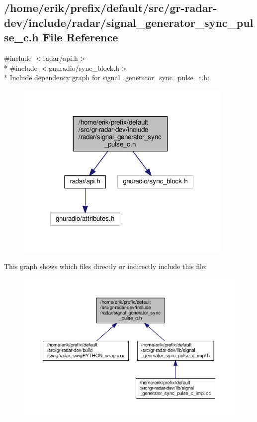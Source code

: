\subsection{/home/erik/prefix/default/src/gr-\/radar-\/dev/include/radar/signal\+\_\+generator\+\_\+sync\+\_\+pulse\+\_\+c.h File Reference}
\label{signal__generator__sync__pulse__c_8h}
{\ttfamily \#include $<$radar/api.\+h$>$}\\*
{\ttfamily \#include $<$gnuradio/sync\+\_\+block.\+h$>$}\\*
Include dependency graph for signal\+\_\+generator\+\_\+sync\+\_\+pulse\+\_\+c.\+h\+:
\nopagebreak
\begin{figure}[H]
\begin{center}
\leavevmode
\includegraphics[width=296pt]{dc/df1/signal__generator__sync__pulse__c_8h__incl}
\end{center}
\end{figure}
This graph shows which files directly or indirectly include this file\+:
\nopagebreak
\begin{figure}[H]
\begin{center}
\leavevmode
\includegraphics[width=350pt]{dd/dbc/signal__generator__sync__pulse__c_8h__dep__incl}
\end{center}
\end{figure}
